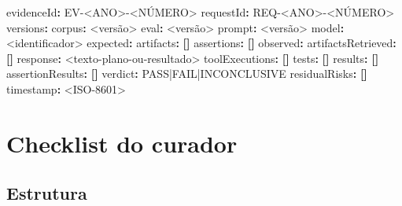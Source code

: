 \documentclass[
  10pt,
  a4paper,
  oneside]{book}
\newenvironment{Shaded}{}{}
\newcommand{\AttributeTok}[1]{\textcolor[rgb]{0.49,0.56,0.16}{#1}}
\newcommand{\FunctionTok}[1]{\textcolor[rgb]{0.02,0.16,0.49}{#1}}
\newcommand{\KeywordTok}[1]{\textcolor[rgb]{0.00,0.44,0.13}{\textbf{#1}}}
\begin{document}
\begin{Shaded}
\begin{Highlighting}[]
\FunctionTok{evidenceId}\KeywordTok{:}\AttributeTok{ EV{-}\textless{}ANO\textgreater{}{-}\textless{}NÚMERO\textgreater{}}
\FunctionTok{requestId}\KeywordTok{:}\AttributeTok{ REQ{-}\textless{}ANO\textgreater{}{-}\textless{}NÚMERO\textgreater{}}
\FunctionTok{versions}\KeywordTok{:}
\AttributeTok{  }\FunctionTok{corpus}\KeywordTok{:}\AttributeTok{ \textless{}versão\textgreater{}}
\AttributeTok{  }\FunctionTok{eval}\KeywordTok{:}\AttributeTok{ \textless{}versão\textgreater{}}
\AttributeTok{  }\FunctionTok{prompt}\KeywordTok{:}\AttributeTok{ \textless{}versão\textgreater{}}
\AttributeTok{  }\FunctionTok{model}\KeywordTok{:}\AttributeTok{ \textless{}identificador\textgreater{}}
\FunctionTok{expected}\KeywordTok{:}
\AttributeTok{  }\FunctionTok{artifacts}\KeywordTok{:}\AttributeTok{ }\KeywordTok{[]}
\AttributeTok{  }\FunctionTok{assertions}\KeywordTok{:}\AttributeTok{ }\KeywordTok{[]}
\FunctionTok{observed}\KeywordTok{:}
\AttributeTok{  }\FunctionTok{artifactsRetrieved}\KeywordTok{:}\AttributeTok{ }\KeywordTok{[]}
\AttributeTok{  }\FunctionTok{response}\KeywordTok{:}\AttributeTok{ \textless{}texto{-}plano{-}ou{-}resultado\textgreater{}}
\AttributeTok{  }\FunctionTok{toolExecutions}\KeywordTok{:}\AttributeTok{ }\KeywordTok{[]}
\AttributeTok{  }\FunctionTok{tests}\KeywordTok{:}\AttributeTok{ }\KeywordTok{[]}
\AttributeTok{  }\FunctionTok{results}\KeywordTok{:}\AttributeTok{ }\KeywordTok{[]}
\FunctionTok{assertionResults}\KeywordTok{:}\AttributeTok{ }\KeywordTok{[]}
\FunctionTok{verdict}\KeywordTok{:}\AttributeTok{ PASS|FAIL|INCONCLUSIVE}
\FunctionTok{residualRisks}\KeywordTok{:}\AttributeTok{ }\KeywordTok{[]}
\FunctionTok{timestamp}\KeywordTok{:}\AttributeTok{ \textless{}ISO{-}8601\textgreater{}}
\end{Highlighting}
\end{Shaded}

\hypertarget{checklist-do-curador}{%
\section{Checklist do curador}\label{checklist-do-curador}}

\small

\hypertarget{estrutura}{%
\subsection{Estrutura}\label{estrutura}}
\end{document}

